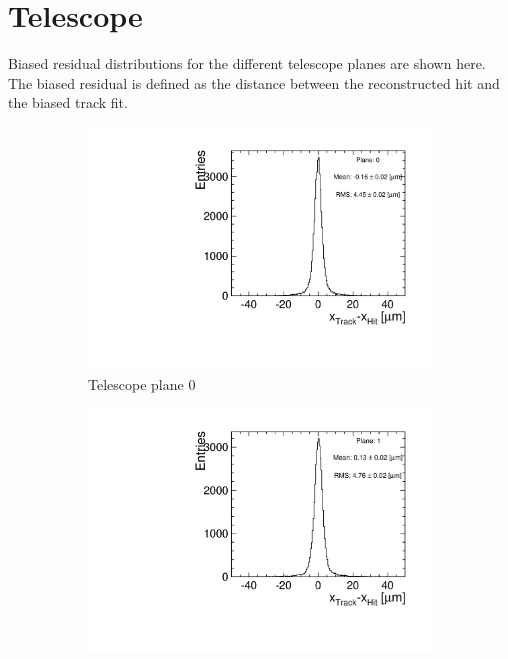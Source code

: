 \chapter{Telescope}
\label{sec:appendixTelescope}

Biased residual distributions for the different telescope planes are
shown here. The biased residual is defined as the distance between the
reconstructed hit and the biased track fit.

\begin{figure}[htbp] \centering
  \begin{subfigure}[b]{0.3\textwidth}
    \includegraphics[width=\textwidth]{figures/Telescope/biasedResiduals/BiasedResiduals_run661_PlaneXRMS0.pdf}
    \caption{Telescope plane 0}
  \end{subfigure}\hfill
  \begin{subfigure}[b]{0.3\textwidth}
    \includegraphics[width=\textwidth]{figures/Telescope/biasedResiduals/BiasedResiduals_run661_PlaneXRMS1.pdf}

\end{subfigure}
\end{figure}
